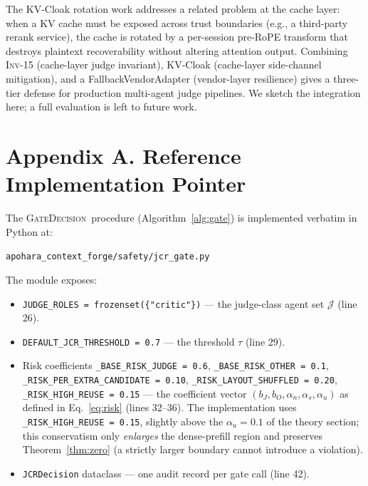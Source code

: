 \documentclass[10pt,twocolumn]{article}
\newcommand{\INV}[1]{\textsc{Inv-#1}}
\newcommand{\Judge}{\mathcal{J}}
\newcommand{\GateDecision}{\textsc{GateDecision}}
\newcommand{\code}[1]{\texttt{\small #1}}
\begin{document}
The KV-Cloak rotation work \cite{kvcloak} addresses a related
problem at the cache layer: when a KV cache must be exposed across
trust boundaries (e.g., a third-party rerank service), the cache is
rotated by a per-session pre-RoPE transform that destroys plaintext
recoverability without altering attention output. Combining
\INV{15} (cache-layer judge invariant), KV-Cloak (cache-layer
side-channel mitigation), and a FallbackVendorAdapter (vendor-layer
resilience) gives a three-tier defense for production multi-agent
judge pipelines. We sketch the integration here; a full evaluation
is left to future work.

\section*{Appendix A. Reference Implementation Pointer}
\label{appendix:code}

The \GateDecision\ procedure (Algorithm~\ref{alg:gate}) is implemented
verbatim in Python at:

\begin{center}
\code{apohara\_context\_forge/safety/jcr\_gate.py}
\end{center}

The module exposes:

\begin{itemize}
  \item \code{JUDGE\_ROLES = frozenset(\{"critic"\})} --- the
        judge-class agent set $\Judge$ (line 26).
  \item \code{DEFAULT\_JCR\_THRESHOLD = 0.7} --- the threshold
        $\tau$ (line 29).
  \item Risk coefficients \code{\_BASE\_RISK\_JUDGE = 0.6},
        \code{\_BASE\_RISK\_OTHER = 0.1},
        \code{\_RISK\_PER\_EXTRA\_CANDIDATE = 0.10},
        \code{\_RISK\_LAYOUT\_SHUFFLED = 0.20},
        \code{\_RISK\_HIGH\_REUSE = 0.15} --- the coefficient
        vector $(b_J, b_O, \alpha_n, \alpha_s, \alpha_u)$ as defined
        in Eq.~\ref{eq:risk} (lines 32--36). The implementation uses
        \code{\_RISK\_HIGH\_REUSE = 0.15}, slightly above the
        $\alpha_u = 0.1$ of the theory section; this conservatism
        only \emph{enlarges} the dense-prefill region and preserves
        Theorem~\ref{thm:zero} (a strictly larger boundary cannot
        introduce a violation).
  \item \code{JCRDecision} dataclass --- one audit record per gate
        call (line 42).
\end{itemize}
\end{document}
